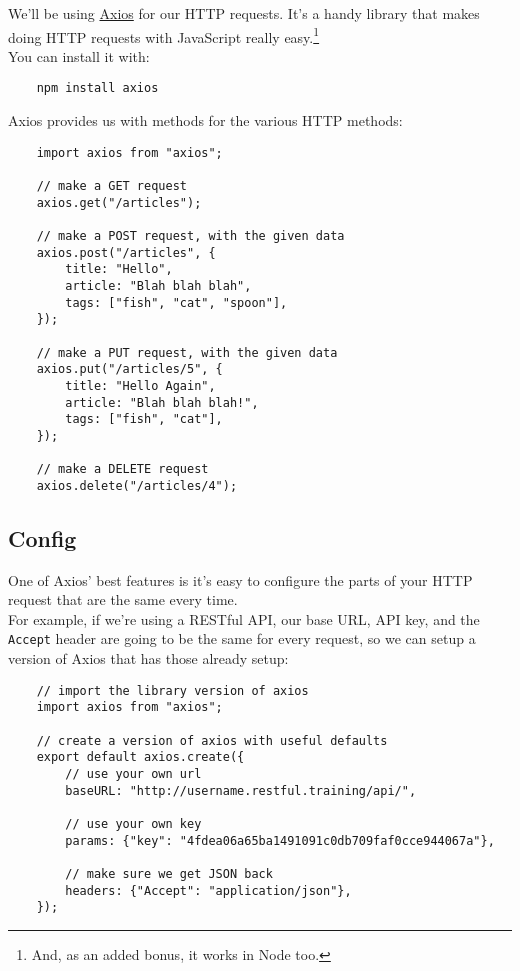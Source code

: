 We'll be using \href{https://github.com/mzabriskie/axios}{Axios} for our HTTP requests. It's a handy library that makes doing HTTP requests with JavaScript really easy.\footnote{And, as an added bonus, it works in Node too.}
\\

You can install it with:

\begin{verbatim}
    npm install axios
\end{verbatim}

Axios provides us with methods for the various HTTP methods:

\begin{verbatim}
    import axios from "axios";

    // make a GET request
    axios.get("/articles");

    // make a POST request, with the given data
    axios.post("/articles", {
        title: "Hello",
        article: "Blah blah blah",
        tags: ["fish", "cat", "spoon"],
    });

    // make a PUT request, with the given data
    axios.put("/articles/5", {
        title: "Hello Again",
        article: "Blah blah blah!",
        tags: ["fish", "cat"],
    });

    // make a DELETE request
    axios.delete("/articles/4");
\end{verbatim}


\subsection{Config}

One of Axios' best features is it's easy to configure the parts of your HTTP request that are the same every time.
\\

For example, if we're using a RESTful API, our base URL, API key, and the \texttt{Accept} header are going to be the same for every request, so we can setup a version of Axios that has those already setup:

\begin{verbatim}
    // import the library version of axios
    import axios from "axios";

    // create a version of axios with useful defaults
    export default axios.create({
        // use your own url
        baseURL: "http://username.restful.training/api/",

        // use your own key
        params: {"key": "4fdea06a65ba1491091c0db709faf0cce944067a"},

        // make sure we get JSON back
        headers: {"Accept": "application/json"},
    });
\end{verbatim}

